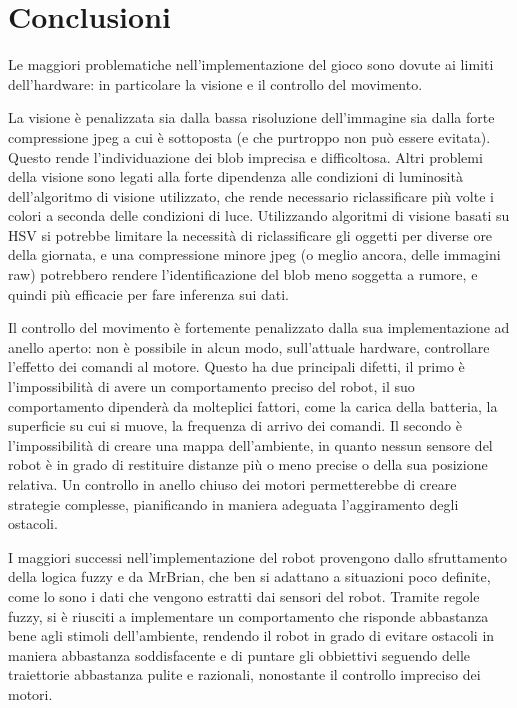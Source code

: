\chapter{Conclusioni}
\label{cap:conclusioni}

Le maggiori problematiche nell'implementazione del gioco sono dovute ai limiti dell'hardware: in particolare la visione e il controllo del movimento. 

La visione è penalizzata sia dalla bassa risoluzione dell'immagine sia dalla forte compressione jpeg a cui è sottoposta (e che purtroppo non può essere evitata). Questo rende l'individuazione dei blob imprecisa e difficoltosa. Altri problemi della visione sono legati alla forte dipendenza alle condizioni di luminosità dell'algoritmo di visione utilizzato, che rende necessario riclassificare più volte i colori a seconda delle condizioni di luce. Utilizzando algoritmi di visione basati su HSV si potrebbe limitare la necessità di riclassificare gli oggetti per diverse ore della giornata, e una compressione minore jpeg (o meglio ancora, delle immagini raw) potrebbero rendere l'identificazione del blob meno soggetta a rumore, e quindi più efficacie per fare inferenza sui dati.

Il controllo del movimento è fortemente penalizzato dalla sua implementazione ad anello aperto: non è possibile in alcun modo, sull'attuale hardware, controllare l'effetto dei comandi al motore. Questo ha due principali difetti, il primo è l'impossibilità di avere un comportamento preciso del robot, il suo comportamento dipenderà da molteplici fattori, come la carica della batteria, la superficie su cui si muove, la frequenza di arrivo dei comandi. Il secondo è l'impossibilità di creare una mappa dell'ambiente, in quanto nessun sensore del robot è in grado di restituire distanze più o meno precise o della sua posizione relativa. Un controllo in anello chiuso dei motori permetterebbe di creare strategie complesse, pianificando in maniera adeguata l'aggiramento degli ostacoli.

I maggiori successi nell'implementazione del robot provengono dallo sfruttamento della logica fuzzy e da MrBrian, che ben si adattano a situazioni poco definite, come lo sono i dati che vengono estratti dai sensori del robot. Tramite regole fuzzy, si è riusciti a implementare un comportamento che risponde abbastanza bene agli stimoli dell'ambiente, rendendo il robot in grado di evitare ostacoli in maniera abbastanza soddisfacente e di puntare gli obbiettivi seguendo delle traiettorie abbastanza pulite e razionali, nonostante il controllo impreciso dei motori.

